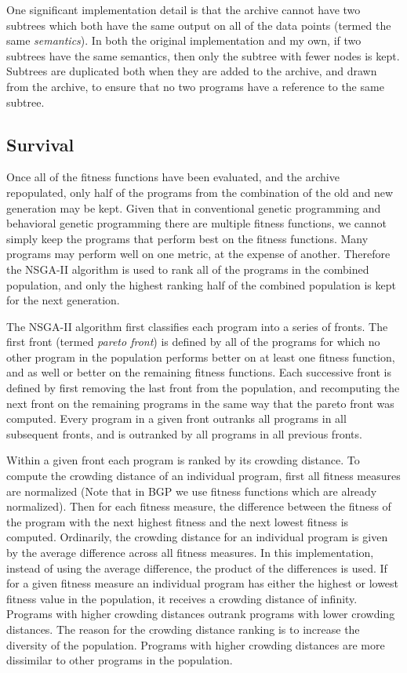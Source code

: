 One significant implementation detail is that the archive cannot have two subtrees which both have the same output on all of the data points (termed the same \textit{semantics}).  In both the original implementation and my own, if two subtrees have the same semantics, then only the subtree with fewer nodes is kept.  Subtrees are duplicated both when they are added to the archive, and drawn from the archive, to ensure that no two programs have a reference to the same subtree.

\subsection{Survival}
\label{section:survival}
Once all of the fitness functions have been evaluated, and the archive repopulated, only half of the programs from the combination of the old and new generation may be kept.  Given that in conventional genetic programming and behavioral genetic programming there are multiple fitness functions, we cannot simply keep the programs that perform best on the fitness functions.  Many programs may perform well on one metric, at the expense of another.  Therefore the NSGA-II algorithm \cite{nsga} is used to rank all of the programs in the combined population, and only the highest ranking half of the combined population is kept for the next generation.

The NSGA-II algorithm first classifies each program into a series of fronts.  The first front (termed \textit{pareto front}) is defined by all of the programs for which no other program in the population performs better on at least one fitness function, and as well or better on the remaining fitness functions.  Each successive front is defined by first removing the last front from the population, and recomputing the next front on the remaining programs in the same way that the pareto front was computed.  Every program in a given front outranks all programs in all subsequent fronts, and is outranked by all programs in all previous fronts.

Within a given front each program is ranked by its crowding distance.  To compute the crowding distance of an individual program, first all fitness measures are normalized (Note that in BGP we use fitness functions which are already normalized).  Then for each fitness measure, the difference between the fitness of the program with the next highest fitness and the next lowest fitness is computed.  Ordinarily, the crowding distance for an individual program is given by the average difference across all fitness measures.  In this implementation, instead of using the average difference, the product of the differences is used.  If for a given fitness measure an individual program has either the highest or lowest fitness value in the population, it receives a crowding distance of infinity.  Programs with higher crowding distances outrank programs with lower crowding distances.  The reason for the crowding distance ranking is to increase the diversity of the population.  Programs with higher crowding distances are more dissimilar to other programs in the population.

